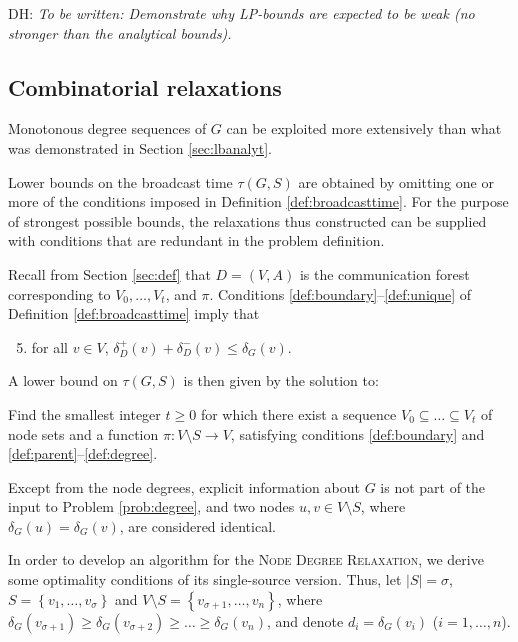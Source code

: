 DH: \emph{To be written: Demonstrate why LP-bounds are expected to be weak (no stronger than the analytical bounds).}

\subsection{Combinatorial relaxations} \label{sec:lbcombrel}

Monotonous degree sequences of $G$ can be exploited more extensively than what was demonstrated in Section \ref{sec:lbanalyt}. 

Lower bounds on the broadcast time $\tau(G,S)$ are obtained by omitting one or more of the conditions imposed in Definition \ref{def:broadcasttime}.
For the purpose of strongest possible bounds, the relaxations thus constructed can be supplied with conditions that are redundant in the problem definition.

Recall from Section \ref{sec:def} that $D=(V,A)$ is the communication forest corresponding to $V_0,\ldots,V_t$, and $\pi$.
Conditions \ref{def:boundary}--\ref{def:unique} of Definition \ref{def:broadcasttime} imply that
\begin{enumerate}
\setcounter{enumi}{4}
  \item for all $v\in V$, $\delta_D^+(v)+\delta_D^-(v)\leq\delta_G(v)$. \label{def:degree}
\end{enumerate}

\noindent
A lower bound on $\tau(G,S)$ is then given by the solution to:
\begin{problem}\label{prob:degree}
Find the smallest integer $t\geq 0$ for which there exist
a sequence $V_0\subseteq\dots\subseteq V_t$ of node sets and a function $\pi:V\setminus S\to V$,
satisfying conditions \ref{def:boundary} and \ref{def:parent}--\ref{def:degree}.
\end{problem}

Except from the node degrees, explicit information about $G$ is not part of the input to Problem \ref{prob:degree},
and two nodes $u,v\in V\setminus S$, where $\delta_G(u)=\delta_G(v)$, are considered identical.

In order to develop an algorithm for the \textsc{Node Degree Relaxation}, we derive some optimality conditions of its single-source version.
Thus, let $|S|=\sigma$, $S=\left\{v_1,\dots,v_{\sigma}\right\}$ and $V\setminus S=\left\{v_{\sigma+1},\ldots,v_n\right\}$, where $\delta_G(v_{\sigma+1})\geq\delta_G(v_{\sigma+2})\geq\dots\geq\delta_G(v_n)$,
and denote $d_i=\delta_G(v_i)$ ($i=1,\ldots,n$).

